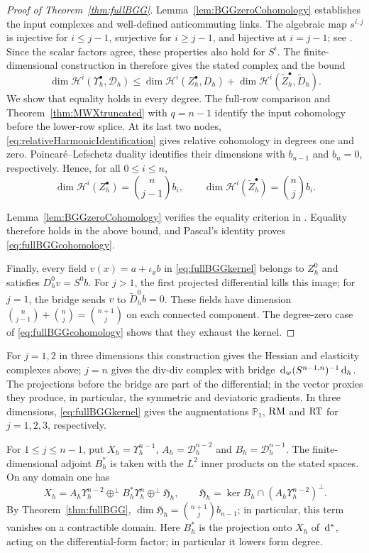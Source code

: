 \documentclass[10pt]{amsart}
\numberwithin{equation}{section}
\newcommand{\dd}{\,{\rm d}}
\begin{document}
\begin{proof}[Proof of Theorem~\ref{thm:fullBGG}]
Lemma~\ref{lem:BGGzeroCohomology} establishes the input complexes and
well-defined anticommuting links.
The algebraic map $s^{i,j}$ is injective for $i\leq j-1$, surjective for $i\geq j-1$, and bijective at $i=j-1$; see \cite[Lemma 2]{ArnoldHu2021}.
Since the scalar factors agree, these properties also hold for $S^i$.
The finite-dimensional construction in \cite[Theorem 6]{ArnoldHu2021} therefore gives the stated complex and the bound
\[
\dim \mathscr H^i(\Upsilon_h^\bullet,\mathcal D_h)
\leq \dim \mathscr H^i(Z_h^\bullet,D_h)
   +\dim \mathscr H^i(\widetilde Z_h^\bullet,\widetilde D_h).
\]
We show that equality holds in every degree. The full-row comparison and
Theorem~\ref{thm:MWXtruncated} with $q=n-1$ identify the input cohomology
before the lower-row splice. At its last two nodes,
\eqref{eq:relativeHarmonicIdentification} gives relative cohomology in
degrees one and zero. Poincar\'e--Lefschetz duality identifies their
dimensions with $b_{n-1}$ and $b_n=0$, respectively. Hence, for all $0\leq i\leq n$,
\[
\dim \mathscr H^i(Z_h^\bullet)=\binom n{j-1}b_i,\qquad
\dim \mathscr H^i(\widetilde Z_h^\bullet)=\binom nj b_i.
\]

Lemma~\ref{lem:BGGzeroCohomology} verifies the equality criterion in
\cite[Theorem 6]{ArnoldHu2021}. Equality therefore holds in the above
bound, and Pascal's identity proves \eqref{eq:fullBGGcohomology}.

Finally, every field $v(x)=a+\iota_xb$ in \eqref{eq:fullBGGkernel}
belongs to $Z_h^0$ and satisfies $D_h^0v=S^0b$.
For $j>1$, the first projected differential kills this image;
for $j=1$, the bridge sends $v$ to $\widetilde D_h^0b=0$.
These fields have dimension $\binom n{j-1}+\binom nj=\binom{n+1}j$
on each connected component. The degree-zero case of
\eqref{eq:fullBGGcohomology} shows that they exhaust the kernel.
\end{proof}

For $j=1,2$ in three dimensions this construction gives the Hessian and elasticity complexes above; $j=n$ gives the div-div complex with bridge $\dd_w(S^{n-1,n})^{-1}\dd_h$.
The projections before the bridge are part of the differential; in the vector proxies they produce, in particular, the symmetric and deviatoric gradients.
In three dimensions, \eqref{eq:fullBGGkernel} gives the augmentations
$\mathbb P_1$, ${\rm RM}$ and ${\rm RT}$ for $j=1,2,3$, respectively.

For $1\leq j\leq n-1$, put $X_h=\Upsilon_h^{n-1}$, $A_h=\mathcal D_h^{n-2}$ and $B_h=\mathcal D_h^{n-1}$.
The finite-dimensional adjoint $B_h^*$ is taken with the $L^2$ inner products on the stated spaces. On any domain one has
\[
X_h=A_h\Upsilon_h^{n-2}\oplus^\perp B_h^*\Upsilon_h^n
       \oplus^\perp\mathfrak H_h,
\qquad
\mathfrak H_h=\ker B_h\cap(A_h\Upsilon_h^{n-2})^\perp.
\]
By Theorem~\ref{thm:fullBGG},
$\dim\mathfrak H_h=\binom{n+1}j b_{n-1}$; in particular, this term
vanishes on a contractible domain.
Here $B_h^*$ is the projection onto $X_h$ of $\dd^*$, acting on the differential-form factor; in particular it lowers form degree.
\end{document}
